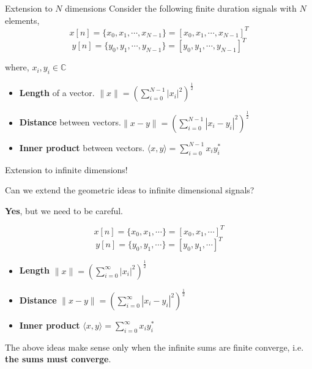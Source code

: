 \documentclass{beamer}
\begin{document}
\begin{frame}{Extension to $N$ dimensions}
Consider the following finite duration signals with $N$ elements,
\[ x[n] = \{\boxed{x_0}, x_1, \cdots, x_{N-1}\} = \left[x_0, x_1, \cdots, x_{N-1}\right]^{T} \]
\[ y[n] = \{\boxed{y_0}, y_1, \cdots, y_{N-1}\} = \left[y_0, y_1, \cdots, y_{N-1}\right]^{T} \]

where, $x_i, y_i \in \mathbb{C}$

\begin{itemize}
\item \textbf{Length} of a vector. $\|x\| = \left(\sum_{i=0}^{N-1} \left|x_i\right| ^2\right)^{\frac{1}{2}}$
\item \textbf{Distance} between vectors.$\|x - y\| = \left(\sum_{i=0}^{N-1} \left|x_i - y_i\right| ^2\right)^{\frac{1}{2}}$
\item \textbf{Inner product} between vectors. $\langle x, y \rangle = \sum_{i=0}^{N-1}x_iy_i^*$
\end{itemize}
\end{frame}

\begin{frame}{Extension to infinite dimensions!}

Can we extend the geometric ideas to infinite dimensional signals?

\textbf{Yes}, but we need to be careful.

\[ x[n] = \{\boxed{x_0}, x_1, \cdots\} = \left[x_0, x_1, \cdots\right]^{T} \]
\[ y[n] = \{\boxed{y_0}, y_1, \cdots\} = \left[y_0, y_1, \cdots\right]^{T} \]

\begin{itemize}
\item \textbf{Length} $\|x\| = \left(\sum_{i=0}^{\infty} \left|x_i\right| ^2\right)^{\frac{1}{2}}$
\item \textbf{Distance} $\|x - y\| = \left(\sum_{i=0}^{\infty} \left|x_i - y_i\right| ^2\right)^{\frac{1}{2}}$
\item \textbf{Inner product} $\langle x, y \rangle = \sum_{i=0}^{\infty}x_iy_i^*$
\end{itemize}

The above ideas make sense only when the infinite sums are finite converge, i.e. \textbf{the sums must converge}.

\end{frame}
\end{document}
